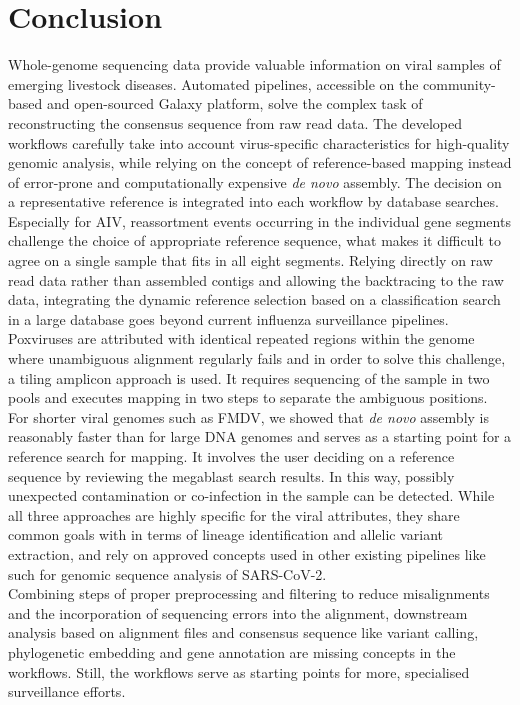 \chapter{Conclusion}\label{chap:conclusion}
Whole-genome sequencing data provide valuable information on viral samples of emerging livestock diseases. Automated pipelines, accessible on the community-based and open-sourced Galaxy platform, solve the complex task of reconstructing the consensus sequence from raw read data. The developed workflows carefully take into account virus-specific characteristics for high-quality genomic analysis, while relying on the concept of reference-based mapping instead of error-prone and computationally expensive \textit{de novo} assembly. The decision on a representative reference is integrated into each workflow by database searches. Especially for \ac{AIV}, reassortment events occurring in the individual gene segments challenge the choice of appropriate reference sequence, what makes it difficult to agree on a single sample that fits in all eight segments. Relying directly on raw read data rather than assembled contigs and allowing the backtracing to the raw data, integrating the dynamic reference selection based on a classification search in a large database goes beyond current influenza surveillance pipelines.\\
Poxviruses are attributed with identical repeated regions within the genome where unambiguous alignment regularly fails and in order to solve this challenge, a tiling amplicon approach is used. It requires sequencing of the sample in two pools and executes mapping in two steps to separate the ambiguous positions.\\
For shorter viral genomes such as \ac{FMDV}, we showed that \textit{de novo} assembly is reasonably faster than for large \ac{DNA} genomes and serves as a starting point for a reference search for mapping. It involves the user deciding on a reference sequence by reviewing the megablast search results. In this way, possibly unexpected contamination or co-infection in the sample can be detected. While all three approaches are highly specific for the viral attributes, they share common goals with in terms of lineage identification and allelic variant extraction, and rely on approved concepts used in other existing pipelines like such for genomic sequence analysis of \ac{SARS-CoV-2}.\\
Combining steps of proper preprocessing and filtering to reduce misalignments and the incorporation of sequencing errors into the alignment, downstream analysis based on alignment files and consensus sequence like variant calling, phylogenetic embedding and gene annotation are missing concepts in the workflows. Still, the workflows serve as starting points for more, specialised surveillance efforts.
